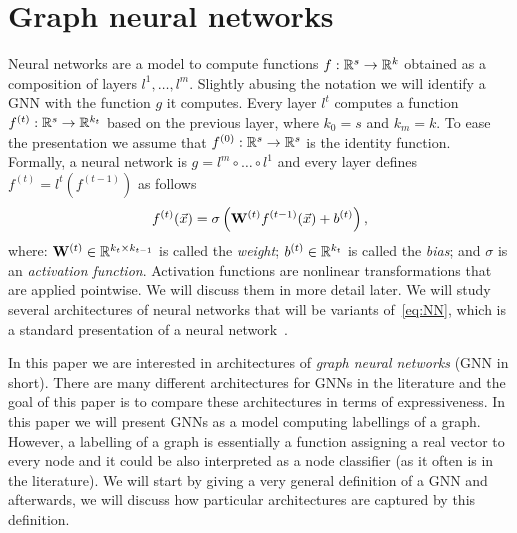 

\section{Graph neural networks}
Neural networks are a model to compute functions $f : \mathbb{R}^s \to \mathbb{R}^k$ obtained as a composition of layers $l^1,\ldots, l^m$.  Slightly abusing the notation we will identify a GNN with the function $g$ it computes. Every layer $l^t$ computes a function $f^{(t)} : \mathbb{R}^{s} \to \mathbb{R}^{k_t}$ based on the previous layer, where $k_0 = s$ and $k_m =k$. To ease the presentation we assume that $f^{(0)} : \mathbb{R}^s \to \mathbb{R}^s$ is the identity function. Formally, a neural network is $g = l^m \circ \ldots \circ l^1 $ and every layer defines $f^{(t)} = l^t(f^{(t-1)})$ as follows
\begin{equation}\label{eq:NN}
 f^{(t)} (\vec{x}) = \sigma \left(\mathbf{W}^{(t)} f^{(t-1)}(\vec{x}) + b^{(t)}  \right),
\end{equation}
where: $\mathbf{W}^{(t)} \in \mathbb{R}^{k_{t} \times k_{t-1}}$ is called the \emph{weight}; $b^{(t)} \in \mathbb{R}^{k_t}$ is called the \emph{bias}; and $\sigma$ is an \emph{activation function}. Activation functions are nonlinear transformations that are applied pointwise. We will discuss them in more detail later. We will study several architectures of neural networks that will be variants of~\eqref{eq:NN}, which is a standard presentation of a neural network~\cite{?}.

In this paper we are interested in architectures of \emph{graph neural networks} (GNN in short). 
There are many different architectures for GNNs in the literature and the goal of this paper is to compare these architectures in terms of expressiveness. In this paper we will present GNNs as a model computing labellings of a graph. However, a labelling of a graph is essentially a function assigning a real vector to every node and it could be also interpreted as a node classifier (as it often is in the literature). We will start by giving a very general definition of a GNN and afterwards, we will discuss how particular architectures are captured by this definition.


